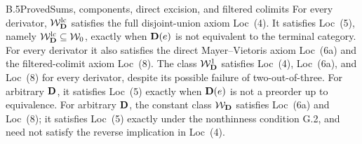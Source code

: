 \begin{claim}{B.5}{Proved}{Sums, components, direct excision, and filtered colimits}
For every derivator, $\mathcal W_{\mathbf D}^{\mathrm{lc}}$ satisfies the full disjoint-union
axiom Loc~(4). It satisfies Loc~(5), namely $\mathcal W_{\mathbf D}^{\mathrm{lc}}\subseteq\mathcal W_0$,
exactly when $\mathbf D(e)$ is not equivalent to the terminal category.
For every derivator it also satisfies
the direct Mayer--Vietoris axiom Loc~(6a) and the filtered-colimit
axiom Loc~(8). The class $\mathcal W_{\mathbf D}^{1}$ satisfies Loc~(4), Loc~(6a),
and Loc~(8) for every derivator, despite its possible failure
of two-out-of-three.
For arbitrary $\mathbf D$, it satisfies Loc~(5) exactly when $\mathbf D(e)$
is not a preorder up to equivalence. For arbitrary $\mathbf D$, the constant
class $\mathcal W_{\mathbf D}$ satisfies Loc~(6a) and Loc~(8); it satisfies Loc~(5)
exactly under the nonthinness condition G.2, and need not satisfy
the reverse implication in Loc~(4).
\end{claim}
